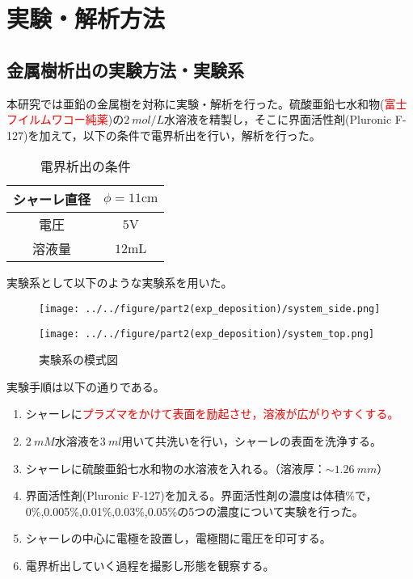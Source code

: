 \documentclass[autodetect-engine,dvi=dvipdfmx,a4paper,ja=standard,oneside,openany,11pt,draft]{bxjsarticle}
\begin{document}
\section{実験・解析方法}
\subsection{金属樹析出の実験方法・実験系}
本研究では亜鉛の金属樹を対称に実験・解析を行った。硫酸亜鉛七水和物(\textcolor{red}{富士フイルムワコー純薬})の$\SI{2}{mol/L}$水溶液を精製し，そこに界面活性剤(Pluronic F-127)を加えて，以下の条件で電界析出を行い，解析を行った。
\begin{table}[H]
  \centering
  \caption{電界析出の条件}
  \begin{tabular}{c||c}
    \hline
    シャーレ直径 & $\phi = 11 \si{\cm}$ \\ \hline
    電圧     & $5 \si{\V}$          \\ \hline
    溶液量    & $12 \si{\mL}$        \\
    \hline
  \end{tabular}
\end{table}
実験系として以下のような実験系を用いた。
\begin{figure}[H]
  \begin{minipage}
    {0.65\textwidth}
    \centering
    \texttt{[image: ../../figure/part2(exp\_deposition)/system\_side.png]}
    \label{fig:el_dep_mol}
  \end{minipage}
  \begin{minipage}
    {0.32\textwidth}
    \centering
    \texttt{[image: ../../figure/part2(exp\_deposition)/system\_top.png]}
    \label{fig:el_dep_fractal}
  \end{minipage}
  \caption{実験系の模式図}
\end{figure}
実験手順は以下の通りである。
\begin{enumerate}
  \item シャーレに\textcolor{red}{プラズマをかけて表面を励起させ，溶液が広がりやすくする。}
  \item {}$\SI{2}{mM}$水溶液を$\SI{3}{ml}$用いて共洗いを行い，シャーレの表面を洗浄する。
  \item シャーレに硫酸亜鉛七水和物の水溶液を入れる。（溶液厚：$\sim\SI{1.26}{mm}$）
  \item 界面活性剤(Pluronic F-127)を加える。界面活性剤の濃度は体積\%で，0\%,0.005\%,0.01\%,0.03\%,0.05\%の5つの濃度について実験を行った。
  \item シャーレの中心に電極を設置し，電極間に電圧を印可する。
  \item 電界析出していく過程を撮影し形態を観察する。
\end{enumerate}
\end{document}
